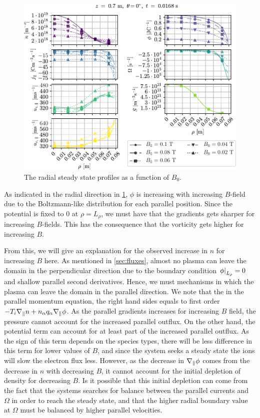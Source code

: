 %
\begin{figure}[htb]
    \centering
    \includegraphics{fig/results/bScan/BScanRad}
    \caption{The radial steady state profiles as a function of $B_0$.}
    \label{fig:BScanRad}
\end{figure}
%
As indicated in the radial direction in \cref{fig:BScanRad}, $\phi$ is increasing with increasing $B$-field due to the Boltzmann-like distribution for each parallel position.
Since the potential is fixed to $0$ at $\rho = L_\rho$, we must have that the gradients gets sharper for increasing $B$-fields.
This has the consequence that the vorticity gets higher for increasing $B$.

From this, we will give an explanation for the observed increase in $n$ for increasing $B$ here.
As mentioned in \cref{sec:fluxes}, almost no plasma can leave the domain in the perpendicular direction due to the boundary condition $\left.\phi\right|_{L_\rho}=0$ and shallow parallel second derivatives.
Hence, we must mechanisms in which the plasma can leave the domain in the parallel direction.
We note that the in the parallel momentum equation, the right hand sides equals to first order $-T_i \nabla_\| n + n_\alpha q_\alpha \nabla_\| \phi$.
As the parallel gradients increases for increasing $B$ field, the pressure cannot account for the increased parallel outflux.
On the other hand, the potential term can account for at least part of the increased parallel outflux.
As the sign of this term depends on the species types, there will be less difference in this term for lower values of $B$, and since the system seeks a steady state the ions will slow the electron flux less.
However, as the decrease in $\nabla_\| \phi$ comes from the decrease in $n$ with decreasing $B$, it cannot account for the initial depletion of density for decreasing $B$.
Is it possible that this initial depletion can come from the fact that the systems searches for balance between the parallel currents and $\Omega$ in order to reach the steady state, and that the higher radial boundary value at $\Omega$ must be balanced by higher parallel velocities.

